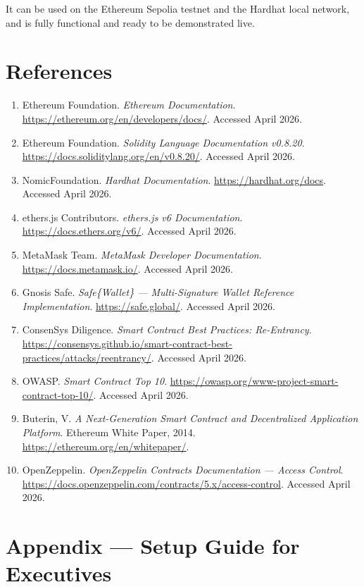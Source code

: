 \documentclass[12pt,a4paper]{article}
\begin{document}
It can be used on the Ethereum Sepolia testnet and the Hardhat local network, and is fully functional and ready to be demonstrated live.
\section{References}

\begin{enumerate}
  \item Ethereum Foundation. \textit{Ethereum Documentation}. \url{https://ethereum.org/en/developers/docs/}. Accessed April 2026.
  \item Ethereum Foundation. \textit{Solidity Language Documentation v0.8.20}. \url{https://docs.soliditylang.org/en/v0.8.20/}. Accessed April 2026.
  \item NomicFoundation. \textit{Hardhat Documentation}. \url{https://hardhat.org/docs}. Accessed April 2026.
  \item ethers.js Contributors. \textit{ethers.js v6 Documentation}. \url{https://docs.ethers.org/v6/}. Accessed April 2026.
  \item MetaMask Team. \textit{MetaMask Developer Documentation}. \url{https://docs.metamask.io/}. Accessed April 2026.
  \item Gnosis Safe. \textit{Safe\{Wallet\} — Multi-Signature Wallet Reference Implementation}. \url{https://safe.global/}. Accessed April 2026.
  \item ConsenSys Diligence. \textit{Smart Contract Best Practices: Re-Entrancy}. \url{https://consensys.github.io/smart-contract-best-practices/attacks/reentrancy/}. Accessed April 2026.
  \item OWASP. \textit{Smart Contract Top 10}. \url{https://owasp.org/www-project-smart-contract-top-10/}. Accessed April 2026.
  \item Buterin, V. \textit{A Next-Generation Smart Contract and Decentralized Application Platform}. Ethereum White Paper, 2014. \url{https://ethereum.org/en/whitepaper/}.
  \item OpenZeppelin. \textit{OpenZeppelin Contracts Documentation — Access Control}. \url{https://docs.openzeppelin.com/contracts/5.x/access-control}. Accessed April 2026.
\end{enumerate}

\section*{Appendix — Setup Guide for Executives}
\end{document}
